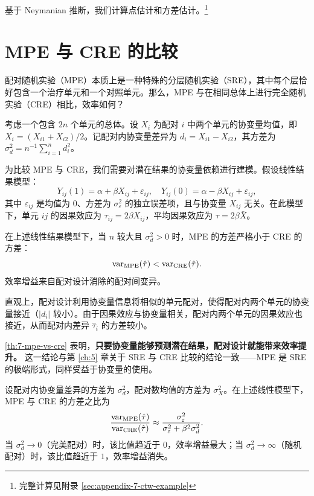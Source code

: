 基于 Neymanian 推断，我们计算点估计和方差估计。\footnote{完整计算见附录 \cref{sec:appendix-7-ctw-example}}

\section{MPE 与 CRE 的比较}\label{sec:7-mpe-vs-cre}

配对随机实验（MPE）本质上是一种特殊的分层随机实验（SRE），其中每个层恰好包含一个治疗单元和一个对照单元。那么，MPE 与在相同总体上进行完全随机实验（CRE）相比，效率如何？

考虑一个包含 $2n$ 个单元的总体。设 $X_i$ 为配对 $i$ 中两个单元的协变量均值，即 $X_i = (X_{i1} + X_{i2}) / 2$。记配对内协变量差异为 $d_i = X_{i1} - X_{i2}$，其方差为 $\sigma_d^2 = n^{-1}\sum_{i=1}^n d_i^2$。

为比较 MPE 与 CRE，我们需要对潜在结果的协变量依赖进行建模。假设线性结果模型：
\[
Y_{ij}(1) = \alpha + \beta X_{ij} + \varepsilon_{ij}, \quad Y_{ij}(0) = \alpha - \beta X_{ij} + \varepsilon_{ij},
\]
其中 $\varepsilon_{ij}$ 是均值为 $0$、方差为 $\sigma_\varepsilon^2$ 的独立误差项，且与协变量 $X_{ij}$ 无关。在此模型下，单元 $ij$ 的因果效应为 $\tau_{ij} = 2\beta X_{ij}$，平均因果效应为 $\tau = 2\beta \bar{X}$。

\begin{Theorem}\label{th:7-mpe-vs-cre}
在上述线性结果模型下，当 $n$ 较大且 $\sigma_d^2 > 0$ 时，MPE 的方差严格小于 CRE 的方差：
\[
\text{var}_{\text{MPE}}(\hat\tau) < \text{var}_{\text{CRE}}(\hat\tau).
\]
效率增益来自配对设计消除的配对间变异。
\end{Theorem}

直观上，配对设计利用协变量信息将相似的单元配对，使得配对内两个单元的协变量接近（$|d_i|$ 较小）。由于因果效应与协变量相关，配对内两个单元的因果效应也接近，从而配对内差异 $\hat\tau_i$ 的方差较小。

\cref{th:7-mpe-vs-cre} 表明，\textbf{只要协变量能够预测潜在结果，配对设计就能带来效率提升。} 这一结论与第 \ref{ch:5} 章关于 SRE 与 CRE 比较的结论一致——MPE 是 SRE 的极端形式，同样受益于协变量的使用。

\begin{Proposition}[效率增益的量化]\label{prop:7-efficiency-gain}
设配对内协变量差异的方差为 $\sigma_d^2$，配对数均值的方差为 $\sigma_X^2$。在上述线性模型下，MPE 与 CRE 的方差之比为
\[
\frac{\text{var}_{\text{MPE}}(\hat\tau)}{\text{var}_{\text{CRE}}(\hat\tau)} \approx \frac{\sigma_\varepsilon^2}{\sigma_\varepsilon^2 + \beta^2 \sigma_d^2}.
\]
当 $\sigma_d^2 \to 0$（完美配对）时，该比值趋近于 $0$，效率增益最大；当 $\sigma_d^2 \to \infty$（随机配对）时，该比值趋近于 $1$，效率增益消失。
\end{Proposition}

